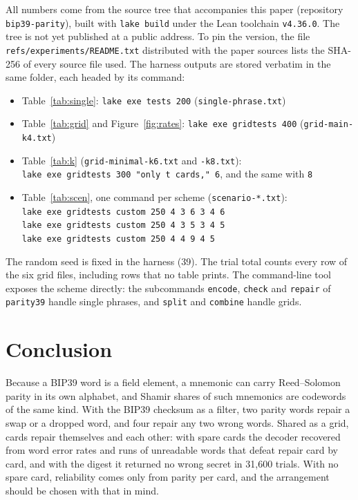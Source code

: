 \documentclass[numeric]{anvil-paper}
\newcommand{\code}[1]{\texttt{#1}}
\begin{document}
All numbers come from the source tree that accompanies this paper (repository
\code{bip39-parity}), built with \code{lake build} under the Lean toolchain
\code{v4.36.0}. The tree is not yet published at a public address. To pin the
version, the file \code{refs/experiments/README.txt} distributed with the paper
sources lists the SHA-256 of every source file used. The harness outputs are
stored verbatim in the same folder, each headed by its command:
\begin{itemize}
\item Table~\ref{tab:single}: \code{lake exe tests 200}
  (\code{single-phrase.txt})
\item Table~\ref{tab:grid} and Figure~\ref{fig:rates}:
  \code{lake exe gridtests 400} (\code{grid-main-k4.txt})
\item Table~\ref{tab:k} (\code{grid-minimal-k6.txt} and \code{-k8.txt}):\\
  \code{lake exe gridtests 300 "only t cards," 6}, and the same with \code{8}
\item Table~\ref{tab:scen}, one command per scheme
  (\code{scenario-*.txt}):\\
  \code{lake exe gridtests custom 250 4 3 6 3 4 6}\\
  \code{lake exe gridtests custom 250 4 3 5 3 4 5}\\
  \code{lake exe gridtests custom 250 4 4 9 4 5}
\end{itemize}
The random seed is fixed in the harness (39). The trial total counts every row
of the six grid files, including rows that no table prints. The command-line tool exposes the scheme directly: the
subcommands \code{encode}, \code{check} and \code{repair} of \code{parity39}
handle single phrases, and \code{split} and \code{combine} handle grids.

\section{Conclusion}
\label{sec:conclusion}

Because a BIP39 word is a field element, a mnemonic can carry Reed--Solomon
parity in its own alphabet, and Shamir shares of such mnemonics are codewords
of the same kind. With the BIP39 checksum as a filter, two parity words repair a swap or a
dropped word, and four repair any two wrong words. Shared as a grid, cards repair themselves and each
other: with spare cards the decoder recovered from word error rates and runs
of unreadable words that defeat repair card by card, and with the digest it
returned no wrong secret in 31{,}600 trials. With no spare card, reliability
comes only from parity per card, and the arrangement should be chosen with
that in mind.



\end{document}
